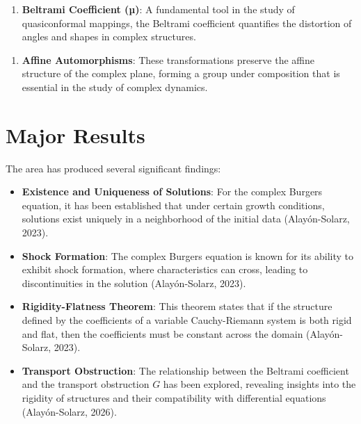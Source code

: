 \documentclass[11pt,a4paper]{article}
\begin{document}
\begin{enumerate}
\item \textbf{Beltrami Coefficient (µ)}: A fundamental tool in the study of quasiconformal mappings, the Beltrami coefficient quantifies the distortion of angles and shapes in complex structures.
\end{enumerate}

\begin{enumerate}
\item \textbf{Affine Automorphisms}: These transformations preserve the affine structure of the complex plane, forming a group under composition that is essential in the study of complex dynamics.
\end{enumerate}

\section{Major Results}

The area has produced several significant findings:

\begin{itemize}
\item \textbf{Existence and Uniqueness of Solutions}: For the complex Burgers equation, it has been established that under certain growth conditions, solutions exist uniquely in a neighborhood of the initial data (Alayón-Solarz, 2023).
\end{itemize}

\begin{itemize}
\item \textbf{Shock Formation}: The complex Burgers equation is known for its ability to exhibit shock formation, where characteristics can cross, leading to discontinuities in the solution (Alayón-Solarz, 2023).
\end{itemize}

\begin{itemize}
\item \textbf{Rigidity-Flatness Theorem}: This theorem states that if the structure defined by the coefficients of a variable Cauchy-Riemann system is both rigid and flat, then the coefficients must be constant across the domain (Alayón-Solarz, 2023).
\end{itemize}

\begin{itemize}
\item \textbf{Transport Obstruction}: The relationship between the Beltrami coefficient and the transport obstruction \( G \) has been explored, revealing insights into the rigidity of structures and their compatibility with differential equations (Alayón-Solarz, 2026).
\end{itemize}
\end{document}
